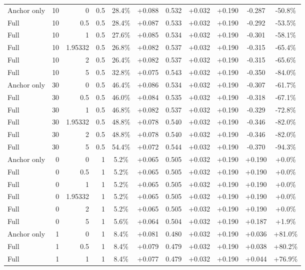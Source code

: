 \begin{table}[htbp]
\begin{tabular}{lrrrccccccc}
Anchor only & 10 & 0 & 0.5 & 28.4\% & +0.088 & 0.532 & +0.032 & +0.190 & -0.287 & -50.8\% \\
Full & 10 & 0.5 & 0.5 & 28.4\% & +0.087 & 0.533 & +0.032 & +0.190 & -0.292 & -53.5\% \\
Full & 10 & 1 & 0.5 & 27.6\% & +0.085 & 0.534 & +0.032 & +0.190 & -0.301 & -58.1\% \\
Full & 10 & 1.95332 & 0.5 & 26.8\% & +0.082 & 0.537 & +0.032 & +0.190 & -0.315 & -65.4\% \\
Full & 10 & 2 & 0.5 & 26.4\% & +0.082 & 0.537 & +0.032 & +0.190 & -0.315 & -65.6\% \\
Full & 10 & 5 & 0.5 & 32.8\% & +0.075 & 0.543 & +0.032 & +0.190 & -0.350 & -84.0\% \\
Anchor only & 30 & 0 & 0.5 & 46.4\% & +0.086 & 0.534 & +0.032 & +0.190 & -0.307 & -61.7\% \\
Full & 30 & 0.5 & 0.5 & 46.0\% & +0.084 & 0.535 & +0.032 & +0.190 & -0.318 & -67.1\% \\
Full & 30 & 1 & 0.5 & 46.8\% & +0.082 & 0.537 & +0.032 & +0.190 & -0.329 & -72.8\% \\
Full & 30 & 1.95332 & 0.5 & 48.8\% & +0.078 & 0.540 & +0.032 & +0.190 & -0.346 & -82.0\% \\
Full & 30 & 2 & 0.5 & 48.8\% & +0.078 & 0.540 & +0.032 & +0.190 & -0.346 & -82.0\% \\
Full & 30 & 5 & 0.5 & 54.4\% & +0.072 & 0.544 & +0.032 & +0.190 & -0.370 & -94.3\% \\
Anchor only & 0 & 0 & 1 & 5.2\% & +0.065 & 0.505 & +0.032 & +0.190 & +0.190 & +0.0\% \\
Full & 0 & 0.5 & 1 & 5.2\% & +0.065 & 0.505 & +0.032 & +0.190 & +0.190 & +0.0\% \\
Full & 0 & 1 & 1 & 5.2\% & +0.065 & 0.505 & +0.032 & +0.190 & +0.190 & +0.0\% \\
Full & 0 & 1.95332 & 1 & 5.2\% & +0.065 & 0.505 & +0.032 & +0.190 & +0.190 & +0.0\% \\
Full & 0 & 2 & 1 & 5.2\% & +0.065 & 0.505 & +0.032 & +0.190 & +0.190 & +0.0\% \\
Full & 0 & 5 & 1 & 5.6\% & +0.064 & 0.504 & +0.032 & +0.190 & +0.187 & +1.9\% \\
Anchor only & 1 & 0 & 1 & 8.4\% & +0.081 & 0.480 & +0.032 & +0.190 & +0.036 & +81.0\% \\
Full & 1 & 0.5 & 1 & 8.4\% & +0.079 & 0.479 & +0.032 & +0.190 & +0.038 & +80.2\% \\
Full & 1 & 1 & 1 & 8.4\% & +0.077 & 0.479 & +0.032 & +0.190 & +0.044 & +76.9\% \\

\end{tabular}
\end{table}
